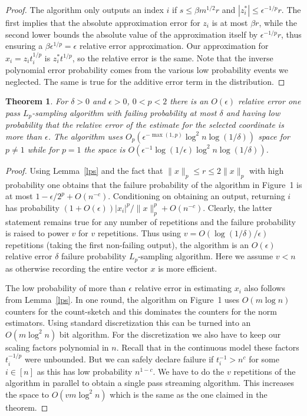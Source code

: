 \documentclass[9pt,letterpaper]{article}
\newtheorem{theorem}{Theorem}
\theoremstyle{remark}
\begin{document}
\begin{proof}
The algorithm only outputs an index $i$ if $s\le\beta m^{1/2}r$ and
$|z^*_i|\le\epsilon^{-1/p}r$. The first implies that the absolute
approximation error for $z_i$ is at most $\beta r$, while the second lower
bounds the absolute value of the approximation itself by $\epsilon^{-1/p}r$,
thus ensuring a $\beta\epsilon^{1/p}=\epsilon$ relative error
approximation. Our approximation for $x_i=z_it_i^{1/p}$ is $z^*_it^{1/p}$, so
the relative error is the same. Note that the
inverse polynomial error probability comes from the various low probability
events we neglected. The same is true for the additive error term in the
distribution.
\end{proof}

\begin{theorem}\label{thm:sampler} For $\delta>0$ and $\epsilon>0$, $0<p<2$ 
 there is an $O(\epsilon)$ relative
  error one pass $L_p$-sampling algorithm with failing probability at most $\delta$ and having
  low probability that the relative error of the estimate for the selected
  coordinate is more than $\epsilon$. 
%  
    The algorithm uses
  $O_p(\epsilon^{-\max(1,p)}\log^2n\log(1/\delta))$ space for $p\ne1$ while
  for $p=1$ the space is
  $O(\epsilon^{-1}\log(1/\epsilon)\log^2n\log(1/\delta))$.
\end{theorem}

\begin{proof}
Using Lemma~\ref{lps} and the fact that $\|x\|_p\le r\le2\|x\|_p$ with high
probability one obtains that the failure probability of the algorithm in Figure~1 
is at most $1-\epsilon/2^p+O(n^{-c})$. Conditioning on
obtaining an output, returning $i$ has probability
$(1+O(\epsilon))|x_i|^p/\|x\|_p^p+O(n^{-c})$. Clearly, the latter statement
remains true for any number of repetitions and the failure probability is
raised to power $v$ for $v$ repetitions. Thus using
$v=O(\log(1/\delta)/\epsilon)$ repetitions (taking the first non-failing output),
 the algorithm is an $O(\epsilon)$
relative error $\delta$ failure probability $L_p$-sampling algorithm. Here we  
assume $v<n$ as otherwise recording the entire vector $x$ is more efficient.

The low probability of more than $\epsilon$ relative error in estimating $x_i$
also follows from Lemma~\ref{lps}.
%
In one round, the algorithm on Figure~1 uses
$O(m\log n)$ counters for the count-sketch and this dominates the
counters for the norm estimators. Using standard discretization this can be
turned into an $O(m\log^2n)$ bit algorithm. For the discretization we also
have to keep our scaling factors polynomial in $n$. Recall that in the
continuous model these factors $t_i^{-1/p}$ were unbounded. But we can safely
declare failure if $t_i^{-1}>n^c$ for some $i\in[n]$ as this has low
probability $n^{1-c}$. We have to do the $v$ repetitions of the algorithm
in parallel to obtain a single pass streaming algorithm. This increases the
space to $O(vm\log^2n)$ which is the same as the one claimed in the theorem.
\end{proof}
\end{document}
